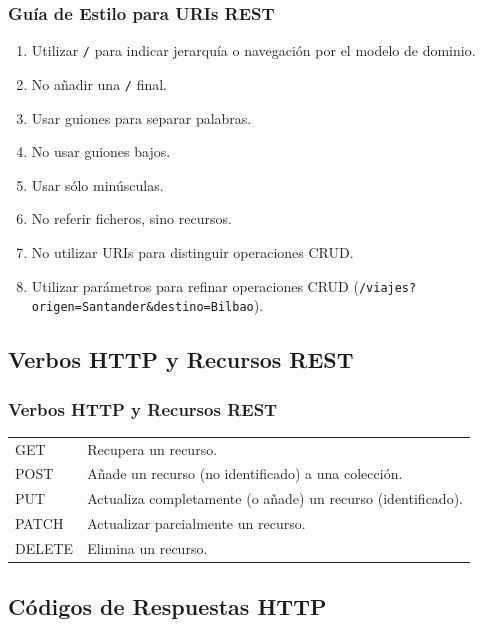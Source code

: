 \documentclass[a4paper,slidestop,xcolor=pst,blue]{beamer}
\begin{document}
\begin{frame}[c]
    \frametitle{Guía de Estilo para URIs REST}
    \begin{enumerate}[<+->]
        \item Utilizar \texttt{/} para indicar jerarquía o navegación por el modelo de dominio.
        \item No añadir una \texttt{/} final.
        \item Usar guiones \texttt{\-} para separar palabras.
        \item No usar guiones bajos.
        \item Usar sólo minúsculas.
        \item No referir ficheros, sino recursos.
        \item No utilizar URIs para distinguir operaciones CRUD.
        \item Utilizar parámetros para refinar operaciones CRUD (\texttt{/viajes?origen=Santander\&destino=Bilbao}).
    \end{enumerate}
\end{frame}

\subsection{Verbos HTTP y Recursos REST}

\begin{frame}[c]
    \frametitle{Verbos HTTP y Recursos REST}
    \begin{tabular}{ll} \hline
        GET    & Recupera un recurso. \\
        POST   & Añade un recurso (no identificado) a una colección. \\
        PUT    & Actualiza completamente (o añade) un recurso (identificado). \\
        PATCH  & Actualizar parcialmente un recurso. \\
        DELETE & Elimina un recurso. \\ \hline
    \end{tabular}
\end{frame}

\subsection{Códigos de Respuestas HTTP}
\end{document}
